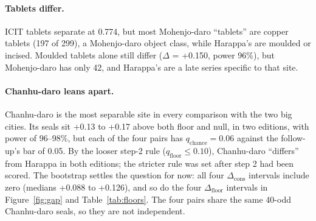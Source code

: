 \documentclass[11pt,a4paper]{article}
\begin{document}
\paragraph{Tablets differ.} ICIT tablets separate at 0.774, but most Mohenjo-daro ``tablets'' are copper tablets (197 of 299), a Mohenjo-daro object class, while Harappa's are moulded or incised. %
Moulded tablets alone still differ ($\Delta$ = +0.150, power 96\%), but Mohenjo-daro has only 42, and Harappa's are a late series specific to that site. %

\paragraph{Chanhu-daro leans apart.} Chanhu-daro is the most separable site in every comparison with the two big cities. %
Its seals sit +0.13 to +0.17 above both floor and null, in two editions, with power of 96--98\%, but each of the four pairs has $q_{\mathrm{chance}} = 0.06$ against the follow-up's bar of 0.05. %
By the looser step-2 rule ($q_{\mathrm{floor}} \leq 0.10$), Chanhu-daro ``differs'' from Harappa in both editions; the stricter rule was set after step 2 had been scored. %
The bootstrap settles the question for now: all four $\Delta_{\mathrm{cons}}$ intervals include zero (medians +0.088 to +0.126), and so do the four $\Delta_{\mathrm{floor}}$ intervals in Figure~\ref{fig:gap} and Table~\ref{tab:floors}. %
The four pairs share the same 40-odd Chanhu-daro seals, so they are not independent.
\end{document}
